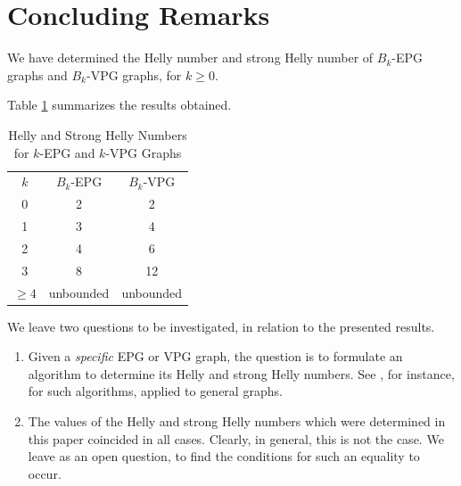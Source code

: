 \section{Concluding Remarks}
We have determined the Helly number and strong Helly number of $B_k$-EPG graphs and $B_k$-VPG graphs, for $k \geq 0$. 

Table \ref{tab:Helly-Strong-Helly} summarizes the results obtained.
 
\Large 

\begin{table}
    \centering
    \begin{tabular}{c|c|c}
    \cline{1-3} $k$  & $B_k$-EPG & $B_k$-VPG \\
    \cline{1-3} 0 & 2 & 2 \\
    \cline{1-3} 1 & 3 & 4 \\
    \cline{1-3} 2 & 4 & 6 \\
    \cline{1-3} 3 & 8 & 12 \\
    \cline{1-3} $\geq 4$ & unbounded & unbounded \\
    \cline{1-3} 
    \end{tabular}
    \caption{Helly and Strong Helly Numbers for $k$-EPG and $k$-VPG Graphs}
    \label{tab:Helly-Strong-Helly}
\end{table}

\normalsize


We leave two questions to be investigated, in relation to the presented results.

\begin{enumerate}
\item Given a {\it specific}  EPG or VPG graph, the question is to formulate an algorithm to determine its Helly and strong Helly numbers. See \cite{dourado2008improved}, for instance, for such algorithms, applied to general graphs. 

\item The values of the Helly and strong Helly numbers which were determined in this paper coincided in all cases. Clearly, in general, this is not the case. We leave as an open question, to find the conditions for such an equality to occur. 
\end{enumerate}



